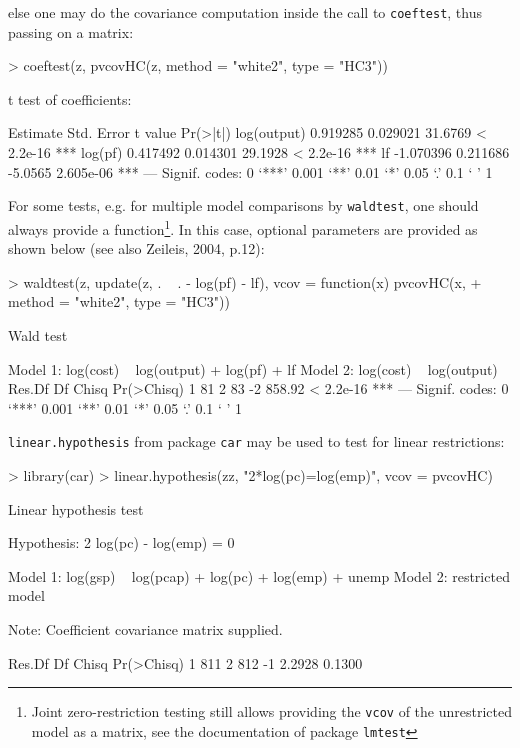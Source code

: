 \documentclass[a4paper]{article}
\begin{document}
else one may do the covariance computation inside the call to \texttt{coeftest}, thus passing on a matrix:

\begin{Schunk}
\begin{Sinput}
> coeftest(z, pvcovHC(z, method = "white2", type = "HC3"))
\end{Sinput}
\begin{Soutput}
t test of coefficients:

             Estimate Std. Error t value  Pr(>|t|)    
log(output)  0.919285   0.029021 31.6769 < 2.2e-16 ***
log(pf)      0.417492   0.014301 29.1928 < 2.2e-16 ***
lf          -1.070396   0.211686 -5.0565 2.605e-06 ***
---
Signif. codes:  0 ‘***’ 0.001 ‘**’ 0.01 ‘*’ 0.05 ‘.’ 0.1 ‘ ’ 1 
\end{Soutput}
\end{Schunk}

For some tests, e.g. for multiple model comparisons by \texttt{waldtest}, one should always provide a function\footnote{Joint zero-restriction testing still allows providing the \texttt{vcov} of the unrestricted model as a matrix, see the documentation of package \texttt{lmtest}}. In this case, optional parameters are provided as shown below (see also Zeileis, 2004, p.12):

\begin{Schunk}
\begin{Sinput}
> waldtest(z, update(z, . ~ . - log(pf) - lf), vcov = function(x) pvcovHC(x, 
+     method = "white2", type = "HC3"))
\end{Sinput}
\begin{Soutput}
Wald test

Model 1: log(cost) ~ log(output) + log(pf) + lf
Model 2: log(cost) ~ log(output)
  Res.Df Df  Chisq Pr(>Chisq)    
1     81                         
2     83 -2 858.92  < 2.2e-16 ***
---
Signif. codes:  0 ‘***’ 0.001 ‘**’ 0.01 ‘*’ 0.05 ‘.’ 0.1 ‘ ’ 1 
\end{Soutput}
\end{Schunk}

\texttt{linear.hypothesis} from package \texttt{car} may be used to test for linear restrictions:

\begin{Schunk}
\begin{Sinput}
> library(car)
> linear.hypothesis(zz, "2*log(pc)=log(emp)", vcov = pvcovHC)
\end{Sinput}
\begin{Soutput}
Linear hypothesis test

Hypothesis:
2 log(pc) - log(emp) = 0

Model 1: log(gsp) ~ log(pcap) + log(pc) + log(emp) + unemp
Model 2: restricted model

Note: Coefficient covariance matrix supplied.

  Res.Df  Df  Chisq Pr(>Chisq)
1    811                      
2    812  -1 2.2928     0.1300
\end{Soutput}
\end{Schunk}
\end{document}
